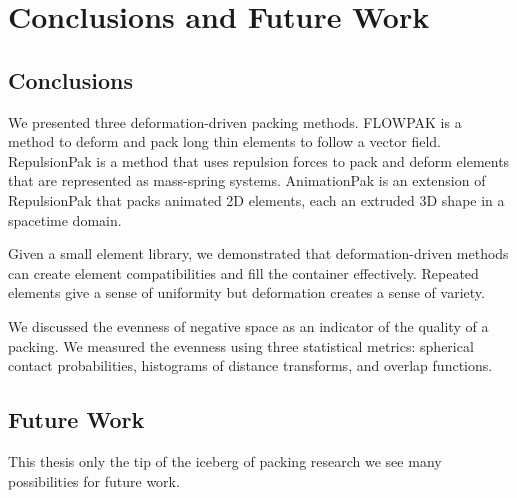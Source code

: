 
\chapter{Conclusions and Future Work}
\label{chapter_conclusions_and_future_work}

\section{Conclusions}

\newtext
{
We presented three deformation-driven packing methods.
FLOWPAK is a method to deform and pack long thin elements to follow a vector field.
RepulsionPak is a method that uses repulsion forces to pack and deform
elements that are represented as mass-spring systems.
AnimationPak is an extension of RepulsionPak that packs animated 2D elements,
each an extruded 3D shape in a spacetime domain.
}

\newtext
{
Given a small element library, 
we demonstrated that deformation-driven methods can create element compatibilities
and fill the container effectively.
Repeated elements give a sense of uniformity but deformation creates a sense of variety.
}

\newtext
{We discussed the evenness of negative space as an indicator of the quality of a packing.
We measured the evenness using three statistical metrics:
spherical contact probabilities, histograms of distance transforms, and overlap functions.
}

\section{Future Work}

\newtext
{
This thesis  only the tip of the iceberg of packing research 
we see many possibilities for future work.
}

